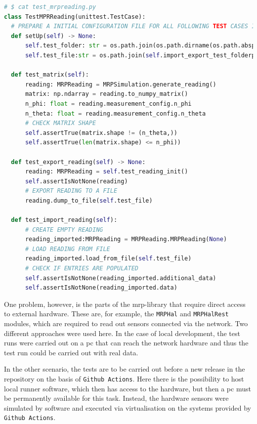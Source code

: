 \begin{lstlisting}[language=Python, caption={Example pytest class for testing MRPReading module functions}, label=lst:pytest_example_code]
# $ cat test_mrpreading.py
class TestMPRReading(unittest.TestCase):
  # PREPARE A INITIAL CONFIGURATION FILE FOR ALL FOLLOWING TEST CASES IN THIS FILE
  def setUp(self) -> None:
      self.test_folder: str = os.path.join(os.path.dirname(os.path.abspath(__file__)), "tmp")
      self.test_file:str = os.path.join(self.import_export_test_folderpath, "tmp")

  def test_matrix(self):
      reading: MRPReading = MRPSimulation.generate_reading()
      matrix: np.ndarray = reading.to_numpy_matrix()
      n_phi: float = reading.measurement_config.n_phi
      n_theta: float = reading.measurement_config.n_theta
      # CHECK MATRIX SHAPE
      self.assertTrue(matrix.shape != (n_theta,))
      self.assertTrue(len(matrix.shape) <= n_phi))

  def test_export_reading(self) -> None:
      reading: MRPReading = self.test_reading_init()
      self.assertIsNotNone(reading)
      # EXPORT READING TO A FILE
      reading.dump_to_file(self.test_file)

  def test_import_reading(self):
      # CREATE EMPTY READING
      reading_imported:MRPReading = MRPReading.MRPReading(None)
      # LOAD READING FROM FILE
      reading_imported.load_from_file(self.test_file)
      # CHECK IF ENTRIES ARE POPULATED
      self.assertIsNotNone(reading_imported.additional_data)
      self.assertIsNotNone(reading_imported.data)
\end{lstlisting}

One problem, however, is the parts of the \gls{mrp}-library that require
direct access to external hardware. These are, for example, the
\passthrough{\lstinline!MRPHal!} and
\passthrough{\lstinline!MRPHalRest!} modules, which are required to read
out sensors connected via the network. Two different approaches were
used here. In the case of local development, the test runs were carried
out on a \gls{pc} that can reach the network hardware and thus the test
run could be carried out with real data.

In the other scenario, the tests are to be carried out before a new
release in the repository on the basis of
\passthrough{\lstinline!Github Actions!}\cite{GithubActions}. Here
there is the possibility to host local runner software, which then has
access to the hardware, but then a \gls{pc} must be permanently
available for this task. Instead, the hardware sensors were simulated by
software and executed via virtualisation on the systems provided by
\passthrough{\lstinline!Github Actions!}\cite{GithubActions}.

